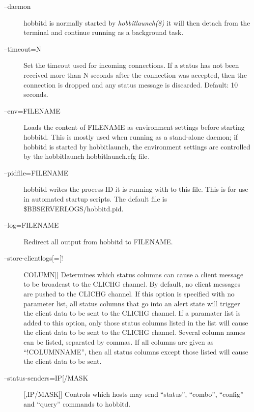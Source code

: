 \begin{description}
 

\item[--daemon] hobbitd is normally started by \emph{hobbitlaunch(8)}
 it will then detach from the terminal and continue running as a background task. 

 

\item[--timeout=N] Set the timeout used for incoming connections. If a status has not been received more than N seconds after the connection was accepted, then the connection is dropped and any status message is discarded. Default: 10 seconds. 

 

\item[--env=FILENAME] Loads the content of FILENAME as environment settings before starting hobbitd. This is mostly used when running as a stand-alone daemon; if hobbitd is started by hobbitlaunch, the environment settings are controlled by the hobbitlaunch hobbitlaunch.cfg file. 

 

\item[--pidfile=FILENAME] hobbitd writes the process-ID it is running with to this file. This is for use in automated startup scripts. The default file is \$BBSERVERLOGS/hobbitd.pid. 

 

\item[--log=FILENAME] Redirect all output from hobbitd to FILENAME. 

 

\item[--store-clientlogs[=[!]COLUMN]] Determines which status columns can cause a client message to be broadcast to the CLICHG channel. By default, no client messages are pushed to the CLICHG channel. If this option is specified with no parameter list, all status columns that go into an alert state will trigger the client data to be sent to the CLICHG channel. If a paramater list is added to this option, only those status columns listed in the list will cause the client data to be sent to the CLICHG channel. Several column names can be listed, separated by commas. If all columns are given as ``!COLUMNNAME'', then all status columns except those listed will cause the client data to be sent. 

 

\item[--status-senders=IP[/MASK][,IP/MASK]] Controls which hosts may send ``status'', ``combo'', ``config'' and ``query'' commands to hobbitd. 


\end{description}
